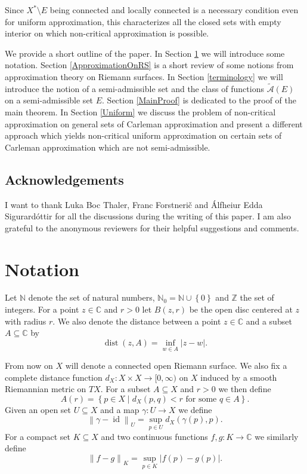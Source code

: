\documentclass[a4paper,11pt]{amsart}
\newcommand{\N}{\mathbb N}
\newcommand{\Z}{\mathbb Z}
\newcommand{\C}{\mathbb C}
\newcommand{\set}[1]{\left\{#1\right\}}
\newcommand{\abs}[1]{\left|#1\right|}
\newcommand{\norm}[1]{\left\lVert#1\right\rVert}
\DeclareMathOperator{\id}{id}
\DeclareMathOperator{\dist}{dist}
\begin{document}
Since $X^*\setminus E$ being connected and locally connected is a necessary condition even for uniform approximation, 
this characterizes all the closed sets with empty interior on which non-critical approximation is possible.

We provide a short outline of the paper.
In Section \ref{notation} we will introduce some notation. 
Section \ref{ApproximationOnRS} is a short review of some notions from approximation theory on Riemann surfaces.
In Section \ref{terminology} we will introduce the notion of a semi-admissible set and the class of functions $\widetilde{\mathcal{A}}(E)$ on a semi-admissible set $E$.
Section \ref{MainProof} is dedicated to the proof of the main theorem.
In Section \ref{Uniform} we discuss the problem of non-critical approximation on general sets of Carleman approximation and present a different
approach which yields non-critical uniform approximation on certain sets of Carleman approximation which are not semi-admissible.
 
\subsection*{Acknowledgements}
I want to thank Luka Boc Thaler, Franc Forstneri\v{c} and \'Alfhei{\dh}ur Edda Sigur{\dh}ard\'ottir for all the discussions during the writing of this paper.
I am also grateful to the anonymous reviewers for their helpful suggestions and comments.


\section{Notation} \label{notation}

Let $\N$ denote the set of natural numbers, $\N_0 = \N \cup \set{0}$ and $\Z$ the set of integers.
For a point $z \in \C$ and $r > 0$ let $B(z,r)$ be the open disc centered at $z$ with radius $r$.
We also denote the distance between a point $z \in \C$ and a subset $A \subseteq \C$ by 
\[\dist(z,A) = \inf_{w \in A} \abs{z-w}.\]

From now on $X$ will denote a connected open Riemann surface. 
We also fix a complete distance function $d_X \colon X \times X \to [0,\infty)$ on $X$ induced by a smooth Riemannian metric on $TX$.
For a subset $A \subseteq X$ and $r>0$ we then define  
\[A(r) = \set{p \in X \mid \text{$d_X(p,q) < r$ for some $q \in A$}}.\] 
Given an open set $U \subseteq X$ and a map $\gamma \colon U \to X$ we define  
\[\norm{\gamma - \id}_U = \sup_{p \in U} d_X(\gamma(p),p).\] 
For a compact set $K \subseteq X$ and two continuous functions $f,g \colon K \to \C$ we similarly define 
\[\norm{f-g}_K = \sup_{p \in K}\abs{f(p)-g(p)}.\] 
\end{document}
